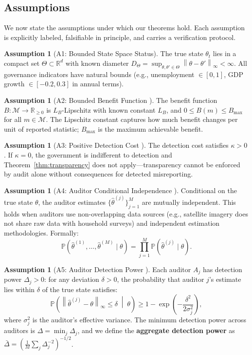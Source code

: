 \documentclass[11pt,a4paper]{article}
\theoremstyle{definition}
\newtheorem{assumption}[theorem]{Assumption}
\newcommand{\R}{\mathbb{R}}
\newcommand{\Pbb}{\mathbb{P}}
\newcommand{\norm}[1]{\left\lVert#1\right\rVert}
\newcommand{\stateSpace}{\Theta}
\newcommand{\claimSpace}{\mathcal{M}}
\begin{document}
\subsection{Assumptions}
We now state the assumptions under which our theorems hold. Each assumption is explicitly labeled, falsifiable in principle, and carries a verification protocol.
\begin{assumption}[A1: Bounded State Space Status]
\label{ass:A1}
The true state $\theta_t$ lies in a compact set $\stateSpace \subset \R^d$ with known diameter $D_\Theta = \sup_{\theta, \theta' \in \stateSpace} \norm{\theta - \theta'}_\infty < \infty$. All governance indicators have natural bounds (e.g., unemployment $\in [0, 1]$, GDP growth $\in [-0.2, 0.3]$ in annual terms).
\end{assumption}
\begin{assumption}[A2: Bounded Benefit Function ]
\label{ass:A2}
The benefit function $B: \claimSpace \to \R_{\geq 0}$ is $L_B$-Lipschitz with known constant $L_B$, and $0 \leq B(m) \leq B_{\max}$ for all $m \in \claimSpace$. The Lipschitz constant captures how much benefit changes per unit of reported statistic; $B_{\max}$ is the maximum achievable benefit.
\end{assumption}
\begin{assumption}[A3: Positive Detection Cost ]
\label{ass:A3}
The detection cost satisfies $\kappa > 0$. If $\kappa = 0$, the government is indifferent to detection and Theorem~\ref{thm:transparency} does not apply---transparency cannot be enforced by audit alone without consequences for detected misreporting.
\end{assumption}
\begin{assumption}[A4: Auditor Conditional Independence ]
\label{ass:A4}
Conditional on the true state $\theta$, the auditor estimates $\{\hat{\theta}^{(j)}\}_{j=1}^M$ are mutually independent. This holds when auditors use non-overlapping data sources (e.g., satellite imagery does not share raw data with household surveys) and independent estimation methodologies. Formally:
\begin{equation}
    \Pbb(\hat{\theta}^{(1)}, \ldots, \hat{\theta}^{(M)} \mid \theta) = \prod_{j=1}^{M} \Pbb(\hat{\theta}^{(j)} \mid \theta).
    \label{eq:independence}
\end{equation}
\end{assumption}
\begin{assumption}[A5: Auditor Detection Power ]
\label{ass:A5}
Each auditor $A_j$ has detection power $\Delta_j > 0$: for any deviation $\delta > 0$, the probability that auditor $j$'s estimate lies within $\delta$ of the true state satisfies:
\begin{equation}
    \Pbb\left(\norm{\hat{\theta}^{(j)} - \theta}_\infty \leq \delta \;\middle|\; \theta\right) \geq 1 - \exp\left(-\frac{\delta^2}{2\sigma_j^2}\right),
    \label{eq:detection_power}
\end{equation}
where $\sigma_j^2$ is the auditor's effective variance. The minimum detection power across auditors is $\Delta = \min_j \Delta_j$, and we define the \textbf{aggregate detection power} as $\bar{\Delta} = (\frac{1}{M}\sum_j \Delta_j^{-2})^{-1/2}$.
\end{assumption}
\end{document}
